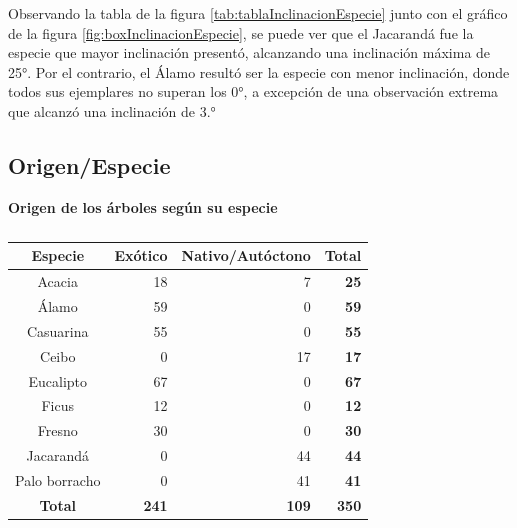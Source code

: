 \documentclass[11pt]{article}
\begin{document}
\begin{justify}
  Observando la tabla de la figura \ref{tab:tablaInclinacionEspecie} junto con el
  gráfico de la figura \ref{fig:boxInclinacionEspecie}, se puede ver que el
  Jacarandá fue la especie que mayor inclinación presentó, alcanzando una
  inclinación máxima de 25°. Por el contrario, el Álamo resultó ser la especie
  con menor inclinación, donde todos sus ejemplares no superan los 0°,
  a excepción de una observación extrema que alcanzó una inclinación de 3.°
\end{justify}


\newpage
\subsection{Origen/Especie}

\begin{table}[h!]
  \begin{center}
    \caption*{\textbf{Origen de los árboles según su especie}}
    \begin{tabular}{| c | r | r | r |}
      \hline
      \textbf{Especie} & \textbf{Exótico} & \textbf{Nativo/Autóctono} &
      \textbf{Total} \\ \hline
      Acacia & 18 & 7 & \textbf{25} \\ \hline
      Álamo & 59 & 0 & \textbf{59} \\ \hline
      Casuarina & 55 & 0 & \textbf{55} \\ \hline
      Ceibo & 0 & 17 & \textbf{17} \\ \hline
      Eucalipto & 67 & 0 & \textbf{67} \\ \hline
      Ficus & 12 & 0 & \textbf{12} \\ \hline
      Fresno & 30 & 0 & \textbf{30} \\ \hline
      Jacarandá & 0 & 44 & \textbf{44} \\ \hline
      Palo borracho & 0 & 41 & \textbf{41} \\ \hline
      \textbf{Total} & \textbf{241} & \textbf{109} & \textbf{350} \\ \hline
    \end{tabular}
    \caption{}
    \label{tab:tablaOrigenEspecie}
  \end{center}
\end{table}
\end{document}
